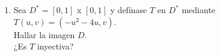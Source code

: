 \documentclass[10pt,letterpaper,fleqn]{article}
\begin{document}
\begin{enumerate}
\begin{proof}
        \vspace{0.2cm}
        Sean $(r,\theta), (r', \theta') \in S^*$.\\\\
        Supongamos que $T(r,\theta) = T(r', \theta')$.\\\\
        $\Rightarrow (r cos \theta, r sin \theta) = (r' cos \theta', r' sin \theta')$.\\
        $\therefore r cos \theta = r' cos \theta'$ y además $r sin \theta = r' sin \theta'$.\\\\
        Esto ocurre $\Leftrightarrow (r = r')$ o bien si $r = r'$ y $\theta = \theta' + 2 \pi k$ con $k \in Z$\\\\
        Al ser $0 < r \leq 1$, $r = r'$.\\\\
        Además, $0 \leq \theta < 2 \pi$, por lo que $k = 0$ y $\theta = \theta'$.\\\\
        $\therefore (r,\theta), (r', \theta')$\\\\
        $\therefore T$ es una inyección.\\
		\end{proof} 
	
		\newpage
        \item Sea $D^* = [0,1]$ x $[0, 1]$ y defínase $T$ en $D^*$ mediante $T(u, v) = (-u^2 - 4u, v).$\\
        Hallar la imagen $D$.\\
        ¿Es $T$ inyectiva?\\
        

\end{enumerate}
\end{document}
